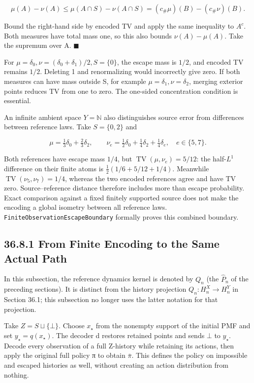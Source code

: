 \documentclass[
  english,
  11pt,
  oneside]{book}
\newcounter{none} %
\begin{document}
\[\mu(A)-\nu(A)\le\mu(A\cap S)-\nu(A\cap S)
=(c_\#\mu)(B)-(c_\#\nu)(B).\]

Bound the right-hand side by encoded TV and apply the same inequality to \(A^c\). Both measures have total mass one, so this also bounds \(\nu(A)-\mu(A)\). Take the supremum over A. \(\blacksquare\)

For \(\mu=\delta_0,\nu=(\delta_0+\delta_1)/2,S=\{0\}\), the escape mass is \(1/2\), and encoded TV remains \(1/2\). Deleting 1 and renormalizing would incorrectly give zero. If both measures can have mass outside S, for example \(\mu=\delta_1,\nu=\delta_2\), merging exterior points reduces TV from one to zero. The one-sided concentration condition is essential.

An infinite ambient space \(Y=\mathbb N\) also distinguishes source error from differences between reference laws. Take \(S=\{0,2\}\) and

\[\mu=\tfrac13\delta_0+\tfrac23\delta_2,\qquad
\nu_e=\tfrac12\delta_0+\tfrac14\delta_2+\tfrac14\delta_e,
\quad e\in\{5,7\}.\]

Both references have escape mass \(1/4\), but \(\operatorname{TV}(\mu,\nu_e)=5/12\): the half-\(L^1\) difference on their finite atoms is \(\tfrac12(1/6+5/12+1/4)\). Meanwhile \(\operatorname{TV}(\nu_5,\nu_7)=1/4\), whereas the two encoded references agree and have TV zero. Source--reference distance therefore includes more than escape probability. Exact comparison against a fixed finitely supported source does not make the encoding a global isometry between all reference laws. \nolinkurl{FiniteObservationEscapeBoundary} formally proves this combined boundary.

\subsection{36.8.1 From Finite Encoding to the Same Actual Path}\label{from-finite-encoding-to-the-same-actual-path}

In this subsection, the reference dynamics kernel is denoted by \(Q_n\) (the \(\widehat P_n\) of the preceding sections). It is distinct from the history projection \(Q_n:H_n^X\to H_n^Y\) in Section 36.1; this subsection no longer uses the latter notation for that projection.

Take \(Z=S\sqcup\{\bot\}\). Choose \(x_\star\) from the nonempty support of the initial PMF and set \(y_\star=q(x_\star)\). The decoder d restores retained points and sends \(\bot\) to \(y_\star\). Decode every observation of a full Z-history while retaining its actions, then apply the original full policy π to obtain \(\bar\pi\). This defines the policy on impossible and escaped histories as well, without creating an action distribution from nothing.
\end{document}

